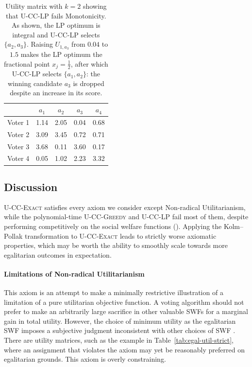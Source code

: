 \documentclass[letterpaper]{article} %
\newcommand{\Exact}{\textsc{U-CC-Exact}}
\newcommand{\Greedy}{\textsc{U-CC-Greedy}}
\newcommand{\LP}{\textsc{U-CC-LP}}
\begin{document}
\begin{table}[t]
\centering
\begin{tabular}{l|cccc}
\hline
 & $a_1$ & $a_2$ & $a_3$ & $a_4$ \\
\hline
Voter 1 & 1.14 & 2.05 & 0.04 & 0.68 \\
Voter 2 & 3.09 & 3.45 & 0.72 & 0.71 \\
Voter 3 & 3.68 & 0.11 & 3.60 & 0.17 \\
Voter 4 & 0.05 & 1.02 & 2.23 & 3.32 \\
\hline
\end{tabular}
\caption{Utility matrix with $k=2$ showing that \LP{} fails Monotonicity.
As shown, the LP optimum is integral and \LP{} selects $\{a_2,a_3\}$.
Raising $U_{1,a_3}$ from $0.04$ to $1.5$ makes the LP optimum the fractional point $x_j=\tfrac12$, after which \LP{} selects $\{a_1,a_2\}$: the winning candidate $a_3$ is dropped despite an increase in its score.}
\label{tab:lp-monotonicity}
\end{table}

\subsection{Discussion}
\label{app:axiom-discussion}

\Exact{} satisfies every axiom we consider except Non-radical Utilitarianism, while the polynomial-time \Greedy{} and \LP{} fail most of them, despite performing competitively on the social welfare functions ().
Applying the Kolm--Pollak transformation to \Exact{} leads to strictly worse axiomatic properties, which may be worth the ability to smoothly scale towards more egalitarian outcomes in expectation.

\paragraph{Limitations of Non-radical Utilitarianism}
This axiom is an attempt to make a minimally restrictive illustration of a limitation of a pure utilitarian objective function.
A voting algorithm should not prefer to make an arbitrarily large sacrifice in other valuable SWFs for a marginal gain in total utility.
However, the choice of minimum utility as the egalitarian SWF imposes a subjective judgment inconsistent with other choices of SWF \citep{atkinson-1970}.
There are utility matrices, such as the example in Table~\ref{tab:egal-util-strict}, where an assignment that violates the axiom may yet be reasonably preferred on egalitarian grounds.
This axiom is overly constraining.
\end{document}
